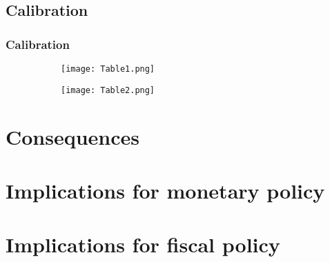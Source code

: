 \documentclass{beamer}
\newcommand\ReduceFont{\fontsize{10}{7.2}\selectfont}
\begin{document}
\subsection{Calibration}
\subsubsection{Calibration}
\begin{frame}{\subsecname}

\begin{figure}
\centering
\begin{subfigure}{\textwidth}
  \centering
  \texttt{[image: Table1.png]}

\end{subfigure}
\begin{subfigure}{\textwidth}
  \centering
  \texttt{[image: Table2.png]}
 
\end{subfigure}
\end{figure}

\end{frame}

\section{Consequences}
\begin{frame}
    \ReduceFont
\end{frame}

\begin{frame}
    \tableofcontents[currentsection, hideothersubsections, sections=\value{section}]
\end{frame}

\section{Implications for monetary policy}
\begin{frame}
    \ReduceFont
\end{frame}

\begin{frame}
    \tableofcontents[currentsection, hideothersubsections, sections=\value{section}]
\end{frame}

\section{Implications for fiscal policy}
\begin{frame}
    \ReduceFont
\end{frame}
\end{document}
